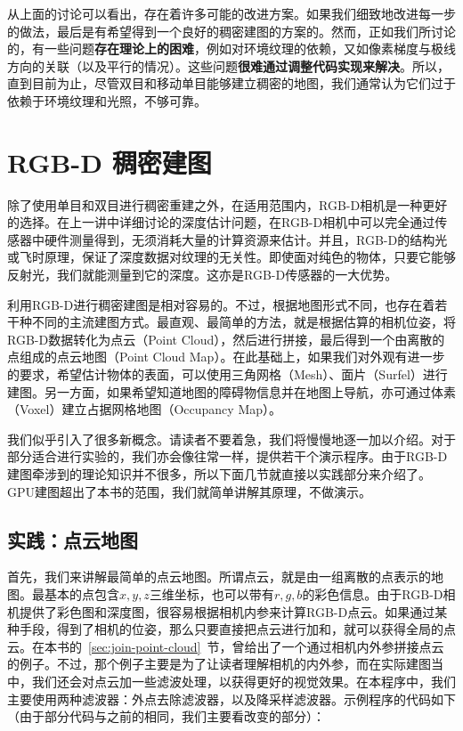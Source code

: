 从上面的讨论可以看出，存在着许多可能的改进方案。如果我们细致地改进每一步的做法，最后是有希望得到一个良好的稠密建图的方案的。然而，正如我们所讨论的，有一些问题\textbf{存在理论上的困难}，例如对环境纹理的依赖，又如像素梯度与极线方向的关联（以及平行的情况）。这些问题\textbf{很难通过调整代码实现来解决}。所以，直到目前为止，尽管双目和移动单目能够建立稠密的地图，我们通常认为它们过于依赖于环境纹理和光照，不够可靠。

\section{RGB-D 稠密建图}
除了使用单目和双目进行稠密重建之外，在适用范围内，RGB-D相机是一种更好的选择。在上一讲中详细讨论的深度估计问题，在RGB-D相机中可以完全通过传感器中硬件测量得到，无须消耗大量的计算资源来估计。并且，RGB-D的结构光或飞时原理，保证了深度数据对纹理的无关性。即使面对纯色的物体，只要它能够反射光，我们就能测量到它的深度。这亦是RGB-D传感器的一大优势。

利用RGB-D进行稠密建图是相对容易的。不过，根据地图形式不同，也存在着若干种不同的主流建图方式。最直观、最简单的方法，就是根据估算的相机位姿，将RGB-D数据转化为点云（Point Cloud），然后进行拼接，最后得到一个由离散的点组成的点云地图（Point Cloud Map）。在此基础上，如果我们对外观有进一步的要求，希望估计物体的表面，可以使用三角网格（Mesh）、面片（Surfel）进行建图。另一方面，如果希望知道地图的障碍物信息并在地图上导航，亦可通过体素（Voxel）建立占据网格地图（Occupancy Map）。

我们似乎引入了很多新概念。请读者不要着急，我们将慢慢地逐一加以介绍。对于部分适合进行实验的，我们亦会像往常一样，提供若干个演示程序。由于RGB-D建图牵涉到的理论知识并不很多，所以下面几节就直接以实践部分来介绍了。GPU建图超出了本书的范围，我们就简单讲解其原理，不做演示。

\subsection{实践：点云地图}
首先，我们来讲解最简单的点云地图。所谓点云，就是由一组离散的点表示的地图。最基本的点包含$x,y,z$三维坐标，也可以带有$r,g,b$的彩色信息。由于RGB-D相机提供了彩色图和深度图，很容易根据相机内参来计算RGB-D点云。如果通过某种手段，得到了相机的位姿，那么只要直接把点云进行加和，就可以获得全局的点云。在本书的~\ref{sec:join-point-cloud}~节，曾给出了一个通过相机内外参拼接点云的例子。不过，那个例子主要是为了让读者理解相机的内外参，而在实际建图当中，我们还会对点云加一些滤波处理，以获得更好的视觉效果。在本程序中，我们主要使用两种滤波器：外点去除滤波器，以及降采样滤波器。示例程序的代码如下（由于部分代码与之前的相同，我们主要看改变的部分）：

